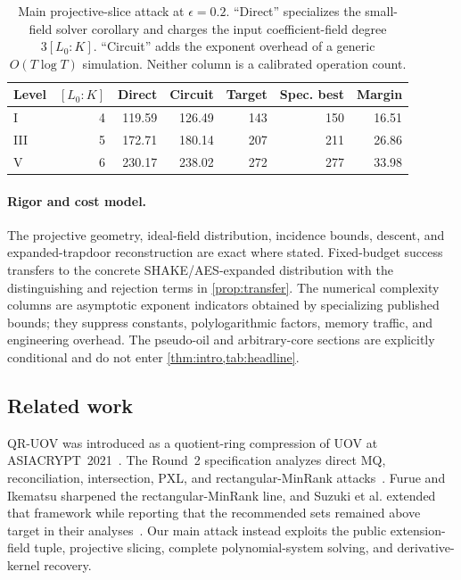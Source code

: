 \documentclass[10pt,a4paper]{article}
\newcommand{\QRUOV}{\textsf{QR-UOV}}
\begin{document}
\begin{table}[t]
\centering
\small
\setlength{\tabcolsep}{4pt}
\caption{Main projective-slice attack at $\epsilon=0.2$.  ``Direct'' specializes the small-field solver corollary and charges the input coefficient-field degree $3[L_0:K]$.  ``Circuit'' adds the exponent overhead of a generic $O(T\log T)$ simulation.  Neither column is a calibrated operation count.}
\label{tab:headline}
\begin{tabular}{@{}lrrrrrr@{}}
\toprule
Level & $[L_0:K]$ & Direct & Circuit & Target & Spec. best & Margin\\
\midrule
I   & 4 & 119.59 & 126.49 & 143 & 150 & 16.51\\
III & 5 & 172.71 & 180.14 & 207 & 211 & 26.86\\
V   & 6 & 230.17 & 238.02 & 272 & 277 & 33.98\\
\bottomrule
\end{tabular}
\end{table}

\paragraph{Rigor and cost model.}
The projective geometry, ideal-field distribution, incidence bounds, descent, and expanded-trapdoor reconstruction are exact where stated.  Fixed-budget success transfers to the concrete SHAKE/AES-expanded distribution with the distinguishing and rejection terms in \cref{prop:transfer}.  The numerical complexity columns are asymptotic exponent indicators obtained by specializing published bounds; they suppress constants, polylogarithmic factors, memory traffic, and engineering overhead.  The pseudo-oil and arbitrary-core sections are explicitly conditional and do not enter \cref{thm:intro,tab:headline}.

\subsection{Related work}\label{sec:related}

\QRUOV{} was introduced as a quotient-ring compression of UOV at ASIACRYPT~2021~\cite{QRUOV2021}.  The Round~2 specification analyzes direct MQ, reconciliation, intersection, PXL, and rectangular-MinRank attacks~\cite{QRUOVSpec}.  Furue and Ikematsu sharpened the rectangular-MinRank line, and Suzuki et al. extended that framework while reporting that the recommended sets remained above target in their analyses~\cite{FurueIkematsu,Suzuki}.  Our main attack instead exploits the public extension-field tuple, projective slicing, complete polynomial-system solving, and derivative-kernel recovery.
\end{document}

